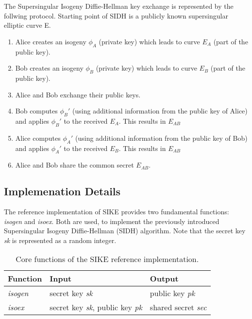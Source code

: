 The Supersingular Isogeny Diffie-Hellman key exchange is represented by the follwing protocol.
Starting point of \gls{SIDH} is a publicly known supersingular elliptic curve E. 

\begin{enumerate}
\item Alice creates an isogeny $\phi_A$ (private key) which leads to curve $E_A$ (part of the public key).
\item Bob creates an isogeny $\phi_B$ (private key) which leads to curve $E_B$ (part of the public key).
\item Alice and Bob exchange their public keys.
\item Bob computes $\phi_B'$ (using additional information from the public key of Alice) and applies $\phi_B'$ to the received $E_A$. This results in $E_{AB}$
\item Alice computes $\phi_A'$ (using additional information from the public key of Bob) and applies $\phi_A'$ to the received $E_B$. This results in $E_{AB}$
\item Alice and Bob share the  common secret $E_{AB}$.
\end{enumerate}

\subsection{Implemenation Details}

The reference implementation of SIKE \parencite{sike2020spec} provides two fundamental functions: \textit{isogen} and \textit{isoex}. Both are used, to implement the previously introduced Supersingular Isogeny Diffie-Hellman (\gls{SIDH}) algorithm. Note that the secret key \textit{sk} is represented as a random integer.
\\

\begin{table}[H]
  \centering
  \begin{tabular}{|K{3cm}|K{3cm}|K{4cm}|}
	\hline
      \textbf{Function} & \textbf{Input} & \textbf{Output} \\
	\hline
      \textit{isogen} & secret key \textit{sk} & public key \textit{pk} \\
     \hline
      \textit{isoex} & secret key \textit{sk}, public key \textit{pk} & shared secret \textit{sec}\\
     \hline
  \end{tabular}
   \caption[Core functions of the SIKE reference implementation]{Core functions of the SIKE reference implementation.}\label{tab:sike_core_functions}
\end{table}

